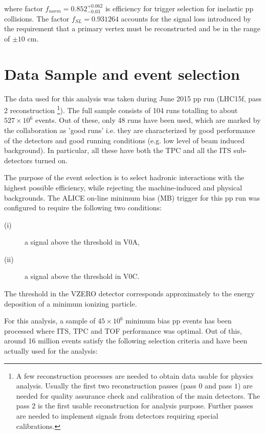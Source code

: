 where factor $f_{norm}= 0.852^{+0.062}_{-0.03}$ is efficiency for trigger selection for inelastic pp collisions.  The factor $f_{SL} = 0.931264$ accounts for the signal loss introduced by the requirement that a primary vertex must be reconstructed and be in the range of  $\pm 10$ cm.

\section{Data Sample and event selection}
\label{par:4.2}

The data used for this analysis was taken during June 2015 pp run (LHC15f, pass 2 reconstruction \footnote{A few reconstruction processes are needed to obtain data usable for physics analysis. Usually the first two reconstruction passes (pass $0$ and pass $1$) are needed for quality assurance check and calibration of the main detectors. The pass $2$ is the first usable reconstruction for analysis purpose. Further passes are needed to implement signals from detectors requiring special calibrations.}). The full sample consists of 104 runs totalling to about $527 \times 10^{6}$ events. Out of these, only 48 runs have been used, which are marked by the collaboration as 'good runs' i.e. they are characterized by good performance of the detectors and good running conditions (e.g. low level of beam induced background). In particular, all these  have both the TPC and all the ITS sub-detectors turned on.


The purpose of the event selection is to select hadronic interactions with the highest possible efficiency, while rejecting the machine-induced and physical backgrounds. The ALICE on-line minimum bias (MB) trigger for this pp run was configured to require the following two conditions: 

\begin{description}
\item[(i)] a signal above the threshold in V0A,
\item[(ii)] a signal above the threshold in V0C.
\end{description}


The threshold in the VZERO detector corresponds approximately to the energy deposition of a minimum ionizing particle. 


For this analysis, a sample of $45 \times 10^{6}$ minimum bias pp events has been processed where ITS, TPC and TOF performance was optimal. Out of this, around 16 million events satisfy the following selection criteria and have been actually used for the analysis:

